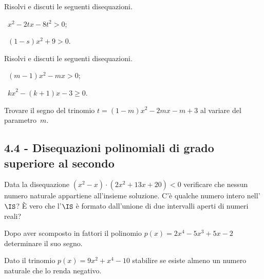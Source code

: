 \begin{esercizio}[\Ast]
 \label{ese:4.29}
Risolvi e discuti le seguenti disequazioni.
\begin{multicols}{2}
 \begin{enumeratea}
 \item~$x^2-2{tx}-8t^2>0$;
 \item~$(1-s)x^2+9>0$.
 \end{enumeratea}
 \end{multicols}
\end{esercizio}

\begin{esercizio}[\Ast]
 \label{ese:4.30}
Risolvi e discuti le seguenti disequazioni.
\begin{multicols}{2}
 \begin{enumeratea}
 \item~$(m-1)x^2-{mx}>0$;
 \item~${kx}^2-(k+1)x-3\ge 0$.
 \end{enumeratea}
 \end{multicols}
\end{esercizio}

\begin{esercizio}
 \label{ese:4.31}
Trovare il segno del trinomio $t=(1-m)x^2-2{mx}-m+3$ al variare del parametro~$m$.
\end{esercizio}

\subsection*{4.4 - Disequazioni polinomiali di grado superiore al secondo}

\begin{esercizio}
 \label{ese:4.32}
Data la disequazione $\left(x^2-x\right)\cdot \left(2x^2+13x+20\right)<0$ verificare che nessun numero naturale appartiene all'insieme soluzione. C'è qualche numero intero nell'$\IS$? È vero che l'$\IS$ è formato dall'unione di due intervalli aperti di numeri reali?
\end{esercizio}

\begin{esercizio}
 \label{ese:4.33}
Dopo aver scomposto in fattori il polinomio $p(x)=2x^4-5x^3+5x-2$ determinare il suo segno.
\end{esercizio}

\begin{esercizio}
 \label{ese:4.34}
Dato il trinomio $p(x)=9x^2+x^4-10$ stabilire se esiste almeno un numero naturale che lo renda negativo.
\end{esercizio}

